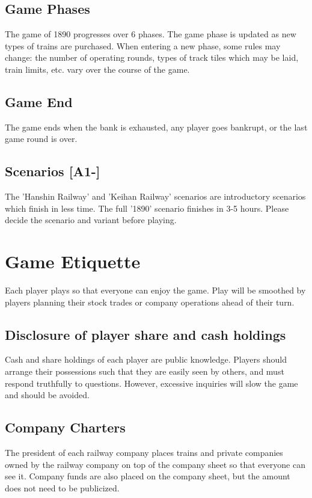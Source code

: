 \documentclass{article}
\begin{document}
\begin{CJK}{UTF8}{min}
\begin{multicols}{2}
\subsection{Game Phases}
The game of 1890 progresses over 6 phases. The game phase is updated
as new types of trains are purchased. When entering a new phase, some
rules may change: the number of operating rounds, types of track tiles
which may be laid, train limits, etc. vary over the course of the
game.


\subsection{Game End}
The game ends when the bank is exhausted, any player goes bankrupt,
or the last game round is over.


\subsection{Scenarios [A1-]}
The 'Hanshin Railway' and 'Keihan Railway' scenarios are introductory
scenarios which finish in less time. The full '1890' scenario finishes
in 3-5 hours. Please decide the scenario and variant before playing.


\section{Game Etiquette}
Each player plays so that everyone can enjoy the game. Play will be
smoothed by players planning their stock trades or company operations
ahead of their turn.


\subsection{Disclosure of player share and cash holdings}
\label{player-cash}
Cash and share holdings of each player are public knowledge. Players
should arrange their possessions such that they are easily seen by
others, and must respond truthfully to questions. However, excessive
inquiries will slow the game and should be avoided.


\subsection{Company Charters}
\label{company-charters}
The president of each railway company places trains and private
companies owned by the railway company on top of the company sheet so
that everyone can see it. Company funds are also placed on the company
sheet, but the amount does not need to be publicized.



\end{multicols}
\end{CJK}
\end{document}
